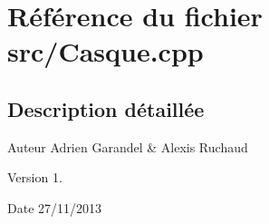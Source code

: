 \section{Référence du fichier src/\-Casque.cpp}
\label{_casque_8cpp}


\subsection{Description détaillée}
\begin{DoxyAuthor}{Auteur}
Adrien Garandel \& Alexis Ruchaud 
\end{DoxyAuthor}
\begin{DoxyVersion}{Version}
1. 
\end{DoxyVersion}
\begin{DoxyDate}{Date}
27/11/2013 
\end{DoxyDate}
